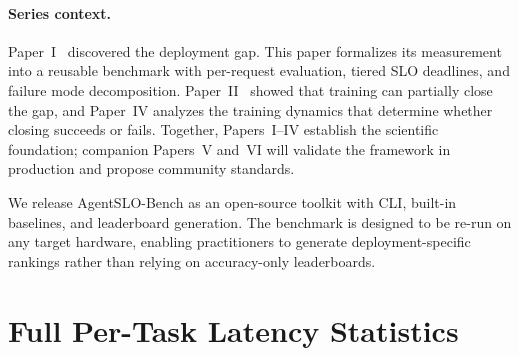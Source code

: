 \documentclass[11pt]{article}
\begin{document}
\paragraph{Series context.}
Paper~I~\cite{maloney2025deploymentgap} discovered the deployment gap.  This paper formalizes its measurement into a reusable benchmark with per-request evaluation, tiered SLO deadlines, and failure mode decomposition.  Paper~II~\cite{maloney2025capacity} showed that training can partially close the gap, and Paper~IV analyzes the training dynamics that determine whether closing succeeds or fails.  Together, Papers~I--IV establish the scientific foundation; companion Papers~V and~VI will validate the framework in production and propose community standards.

We release AgentSLO-Bench as an open-source toolkit with CLI, built-in baselines, and leaderboard generation.  The benchmark is designed to be re-run on any target hardware, enabling practitioners to generate deployment-specific rankings rather than relying on accuracy-only leaderboards.




\appendix
\section{Full Per-Task Latency Statistics}
\label{app:latency}
\end{document}
